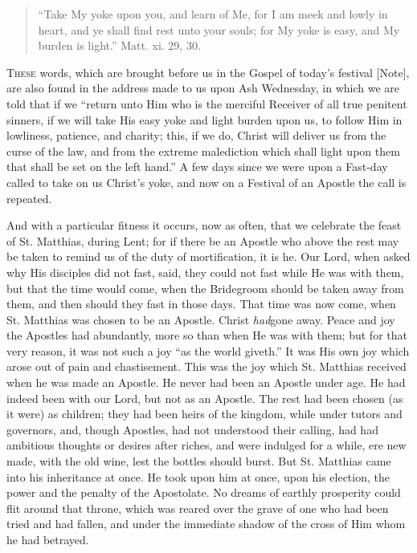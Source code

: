 
\begin{quote}

``Take My yoke upon you, and learn of Me, for I am meek and
lowly in heart, and ye shall find rest unto your souls; for My yoke
is easy, and My burden is light.'' Matt. xi. 29, 30.

\end{quote}

T\textsc{hese} words, which are brought before us in the Gospel of today's
festival [Note], are also found in
the address made to us upon Ash Wednesday, in which we are told that
if we ``return unto Him who is the merciful Receiver of all true
penitent sinners, if we will take His easy yoke and light burden upon
us, to follow Him in lowliness, patience, and charity; this, if we do,
Christ will deliver us from the curse of the law, and from the extreme
malediction which shall light upon them that shall be set on the left
hand.'' A few days since we were upon a Fast-day called to take on
us Christ's yoke, and now on a Festival of an Apostle the call is
repeated.

And with a particular fitness it occurs, now as often, that we
celebrate the feast of St. Matthias, during Lent; for if there be an
Apostle who above the rest may be taken to remind us of the duty of
mortification, it is he. Our Lord, when asked why His disciples did
not fast, said, they could not fast while He was with them, but that
the time would come, when the Bridegroom should be taken away from
them, and then should they fast in those days. That time was now come,
when St. Matthias was chosen to be an Apostle. Christ \emph{had}gone
away. Peace and joy the Apostles had abundantly, more so than when He
was with them; but for that very reason, it was not such a joy
``as the world giveth.'' It was His own joy which arose out of
pain and chastisement. This was the joy which St. Matthias received
when he was made an Apostle. He never had been an Apostle under age.
He had indeed been with our Lord, but not as an Apostle. The rest had
been chosen (as it were) as children; they had been heirs of the
kingdom, while under tutors and governors, and, though Apostles, had
not understood their calling, had had ambitious thoughts or desires
after riches, and were indulged for a while, ere new made, with the
old wine, lest the bottles should burst. But St. Matthias came into
his inheritance at once. He took upon him at once, upon his election,
the power and the penalty of the Apostolate. No dreams of earthly
prosperity could flit around that throne, which was reared over the
grave of one who had been tried and had fallen, and under the
immediate shadow of the cross of Him whom he had betrayed.

